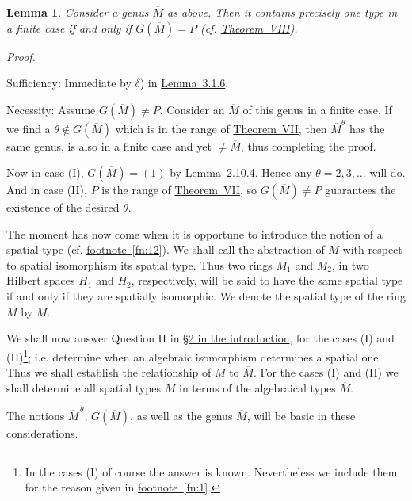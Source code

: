 \documentclass[b5paper,twoside]{article}
\newcommand{\thmref}[2]{\hyperref[#1]{\mbox{Theorem~#2}}}
\newcommand{\lemref}[2]{\hyperref[#1]{\mbox{Lemma~#2}}}
\theoremstyle{mvnplain}
\newtheorem{lemma}{Lemma}[section]
\renewenvironment{proof}[1][Proof]{%
  \par\addvspace{0.35\baselineskip}%
  \noindent\textit{#1.}\ \normalfont\ignorespaces
}{%
  \par\addvspace{0.35\baselineskip}%
}
\newcommand{\M}{\mathbf M}
\newcommand{\Hilbert}{\mathfrak H}
\def\M{M}%
\def\Hilbert{H}%
\def\widetilde#1{#1}%
\def\mathfrak#1{#1}%
\begin{document}
\begin{lemma}\label{lem:3.2.3}
Consider a genus \(\widetilde{\overline{\M}}\) as above. Then it contains
precisely one type in a finite case if and only if
\(\mathfrak G(\widetilde{\overline{\M}})=P\) (cf.
\thmref{thm:VIII}{VIII}).
\end{lemma}

\begin{proof}
Sufficiency: Immediate by \(\delta\)) in \lemref{lem:3.1.6}{3.1.6}.

Necessity: Assume \(\mathfrak G(\widetilde{\overline{\M}})\ne P\).
Consider an \(\overline{\M}\) of this genus in a finite case. If we find a
\(\theta\notin\mathfrak G(\widetilde{\overline{\M}})\) which is in the range
of \thmref{thm:VII}{VII}, then \(\overline{\M}^{\theta}\) has the same genus,
is also in a finite case and yet \(\ne\overline{\M}\), thus completing the
proof.

Now in case (I),
\(\mathfrak G(\widetilde{\overline{\M}})=(1)\) by
\lemref{lem:2.10.4}{2.10.4}. Hence any \(\theta=2,3,\ldots\) will do. And in
case (II), \(P\) is the range of \thmref{thm:VII}{VII}, so
\(\mathfrak G(\widetilde{\overline{\M}})\ne P\) guarantees the existence of
the desired \(\theta\).
\end{proof}

The moment has now come when it is opportune to introduce the notion of a
spatial type (cf. \hyperref[fn:12]{footnote~\ref*{fn:12}}). We shall call the
abstraction of \(\M\) with
respect to spatial isomorphism its spatial type. Thus two rings \(\M_1\) and
\(\M_2\), in two Hilbert spaces \(\Hilbert_1\) and \(\Hilbert_2\),
respectively, will be said to have the same spatial type if and only if they are
spatially isomorphic. We denote the spatial type of the ring \(\M\) by
\(\widetilde{\M}\).

We shall now answer Question II in
\hyperref[intro:2]{\S2 in the introduction}, for the cases (I)
and (II)\footnote{In the cases (I) of course the answer is known. Nevertheless
we include them for the reason given in
\hyperref[fn:1]{footnote~\ref*{fn:1}}.}; i.e. determine when an
algebraic isomorphism determines a spatial one. Thus we shall establish the
relationship of \(\widetilde{\M}\) to \(\overline{\M}\). For the cases (I)
and (II) we shall determine all spatial types \(\widetilde{\M}\) in terms of
the algebraical types \(\overline{\M}\).

The notions \(\overline{\M}^{\,\theta}\),
\(\mathfrak G(\widetilde{\overline{\M}})\), as well as the genus
\(\widetilde{\overline{\M}}\), will be basic in these considerations.
\end{document}

